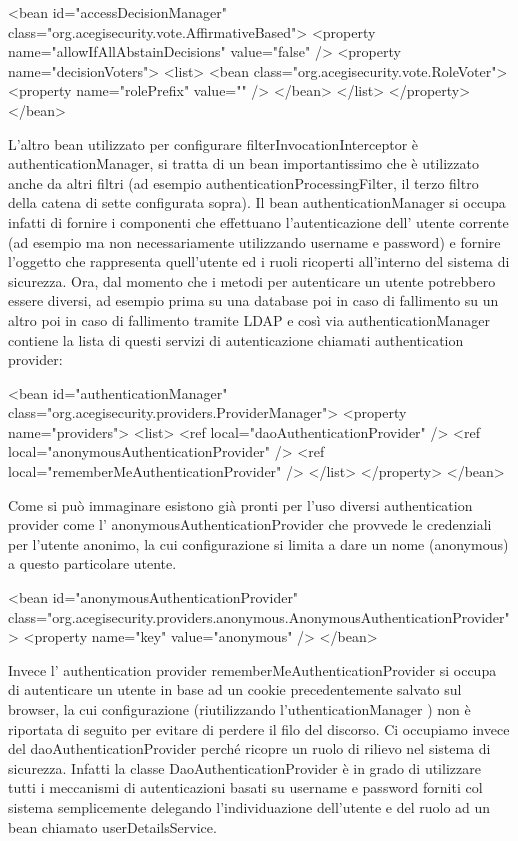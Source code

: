 \begin{xml}
<bean id="accessDecisionManager"
  class="org.acegisecurity.vote.AffirmativeBased">
  <property name="allowIfAllAbstainDecisions" value="false" />
  <property name="decisionVoters">
    <list>
      <bean class="org.acegisecurity.vote.RoleVoter">
        <property name="rolePrefix" value="" />
      </bean>
    </list>
  </property>
</bean>
\end{xml}

L'altro bean utilizzato per configurare  filterInvocationInterceptor è  authenticationManager, si tratta di un bean importantissimo che è utilizzato anche da altri filtri (ad esempio  authenticationProcessingFilter, il terzo filtro della catena di sette configurata sopra). Il bean  authenticationManager si occupa infatti di fornire i componenti che effettuano l'autenticazione dell' utente corrente (ad esempio ma non necessariamente utilizzando username e password) e fornire l'oggetto che rappresenta quell'utente ed i ruoli ricoperti all'interno del sistema di sicurezza. Ora, dal momento che i metodi per autenticare un utente potrebbero essere diversi, ad esempio prima su una database poi in caso di fallimento su un altro poi in caso di fallimento tramite LDAP e così via  authenticationManager contiene la lista di questi servizi di autenticazione chiamati authentication provider:

\begin{xml}
<bean id="authenticationManager"
  class="org.acegisecurity.providers.ProviderManager">
  <property name="providers">
    <list>
       <ref local="daoAuthenticationProvider" />
       <ref local="anonymousAuthenticationProvider" />
       <ref local="rememberMeAuthenticationProvider" />
    </list>
  </property>
</bean>
\end{xml}

Come si può immaginare esistono già pronti per l'uso diversi authentication provider come l' anonymousAuthenticationProvider che provvede le credenziali per l'utente anonimo, la cui configurazione si limita a dare un nome (anonymous)  a questo particolare utente.

\begin{xml}
<bean id="anonymousAuthenticationProvider"
    class="org.acegisecurity.providers.anonymous.AnonymousAuthenticationProvider">
  <property name="key" value="anonymous" />
</bean>
\end{xml}

Invece l' authentication provider  rememberMeAuthenticationProvider si occupa di autenticare un utente in base ad un cookie precedentemente salvato sul browser, la cui configurazione (riutilizzando l'uthenticationManager ) non è riportata di seguito per evitare di perdere il filo del discorso.
Ci occupiamo invece del  daoAuthenticationProvider  perché ricopre un ruolo di rilievo nel sistema di sicurezza. Infatti la classe  DaoAuthenticationProvider è in grado di utilizzare tutti i meccanismi di autenticazioni basati su username e password forniti col sistema semplicemente delegando l'individuazione dell'utente e del ruolo ad un bean chiamato userDetailsService.

